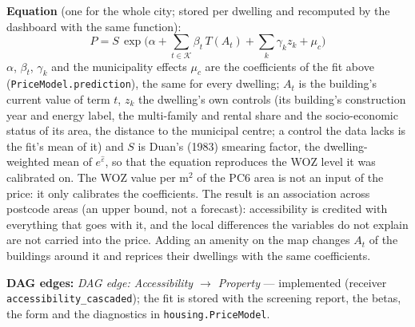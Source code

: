 \documentclass[11pt]{article}
\newcommand{\code}[1]{\texttt{#1}}
\newcommand{\dagedge}[1]{\textit{DAG edge: #1}}
\newcommand{\statusdone}{\textcolor{green!50!black}{implemented}}
\begin{document}
\textbf{Equation} (one for the whole city; stored per dwelling and recomputed by the dashboard with the same function):
\begin{equation}
  P = S\,\exp\!\Big(\alpha + \sum_{t \in \mathcal{K}}\beta_t\,T(A_t) + \sum_k \gamma_k z_k + \mu_{c}\Big)
\end{equation}
$\alpha$, $\beta_t$, $\gamma_k$ and the municipality effects $\mu_c$ are the coefficients of the fit above (\code{PriceModel.prediction}), the same for every dwelling; $A_t$ is the building's current value of term $t$, $z_k$ the dwelling's own controls (its building's construction year and energy label, the multi-family and rental share and the socio-economic status of its area, the distance to the municipal centre; a control the data lacks is the fit's mean of it) and $S$ is Duan's (1983) smearing factor, the dwelling-weighted mean of $e^{\hat\varepsilon}$, so that the equation reproduces the WOZ level it was calibrated on. The WOZ value per m$^2$ of the PC6 area is not an input of the price: it only calibrates the coefficients. The result is an association across postcode areas (an upper bound, not a forecast): accessibility is credited with everything that goes with it, and the local differences the variables do not explain are not carried into the price. Adding an amenity on the map changes $A_t$ of the buildings around it and reprices their dwellings with the same coefficients.

\textbf{DAG edges:} \dagedge{Accessibility $\rightarrow$ Property} --- \statusdone{} (receiver \code{accessibility\_cascaded}); the fit is stored with the screening report, the betas, the form and the diagnostics in \code{housing.PriceModel}.
\end{document}
